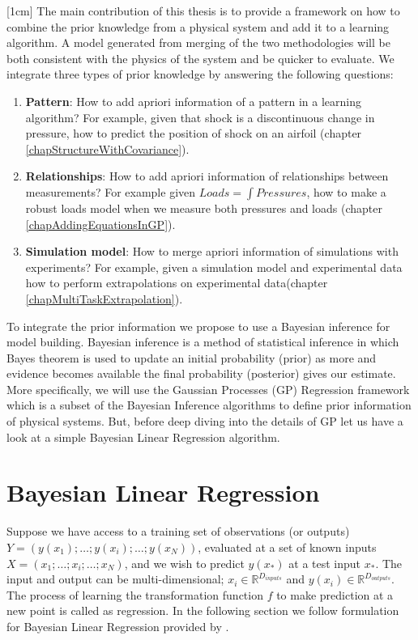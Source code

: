 \begin{mdframed}[hidealllines=true,backgroundcolor=blue!20]
[1cm]
The main contribution of this thesis is to provide a framework on how to combine the prior knowledge from a physical system and add it to a learning algorithm. A model generated from merging of the two methodologies will be both consistent with the physics of the system and be quicker to evaluate. We integrate three types of prior knowledge by answering the following questions:
\begin{enumerate}
\item \textbf{Pattern}: How to add apriori information of a pattern in a learning algorithm? For example, given that shock is a discontinuous change in pressure, how to predict the position of shock on an airfoil (chapter \ref{chapStructureWithCovariance}). 
\item \textbf{Relationships}: How to add apriori information of relationships between measurements? For example given $Loads = \int Pressures$, how to make a robust loads model when we measure both pressures and loads (chapter \ref{chapAddingEquationsInGP}).
\item \textbf{Simulation model}: How to merge apriori information of simulations with experiments? For example, given a simulation model and experimental data how to perform extrapolations on experimental data(chapter \ref{chapMultiTaskExtrapolation}). 
\end{enumerate}

To integrate the prior information we propose to use a Bayesian inference for model building. Bayesian inference is a method of statistical inference in which Bayes theorem is used to update an initial probability (prior) as more and evidence becomes available the final probability (posterior) gives our estimate. More specifically, we will use the Gaussian Processes (GP) Regression framework which is a subset of the Bayesian Inference algorithms to define prior information of physical systems. But, before deep diving into the details of GP let us have a look at a simple Bayesian Linear Regression algorithm.
\end{mdframed}

\section{Bayesian Linear Regression}\label{secBayesianModelling}
Suppose we have access to a training set of observations (or outputs) $Y = (y(x_{1}); \ldots ; y(x_{i}); \ldots ; y(x_{N}))$, evaluated at a set of known inputs $X = (x_{1}; \ldots ; x_{i}; \ldots; x_{N})$, and we wish to predict $y(x_{*})$ at a test input $x_{*}$. The input and output can be multi-dimensional; $x_{i} \in \mathbb{R}^{D_{inputs}}$ and $y(x_{i}) \in \mathbb{R}^{D_{outputs}}$. The process of learning the transformation function $f$ to make prediction at a new point is called as regression. In the following section we follow formulation for Bayesian Linear Regression provided by \cite{mackay2003information}.

